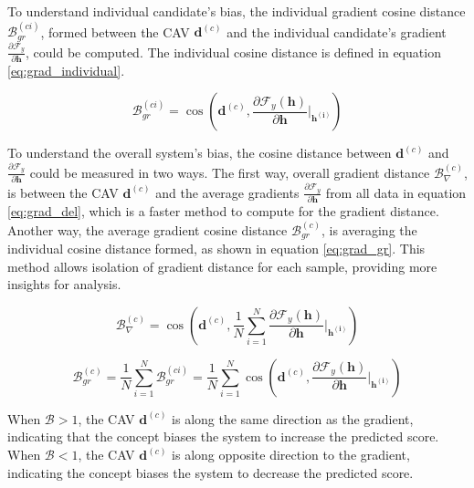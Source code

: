 To understand individual candidate's bias, the individual gradient cosine distance $\mathcal{B}^{(ci)}_{gr}$, formed between the CAV $\boldsymbol{d}^{(c)}$ and the individual candidate's gradient $\frac{\partial \mathcal{F}_y}{\partial \boldsymbol{h}}$, could be computed. The individual cosine distance is defined in equation \ref{eq:grad_individual}.  

\begin{equation} \label{eq:grad_individual}
    \mathcal{B}^{(ci)}_{gr} = \cos\left(\boldsymbol{d}^{(c)}, \frac{\partial \mathcal{F}_y(\boldsymbol{h})}{\partial \boldsymbol{h}}\vert_{\boldsymbol{h^{(i)}}} \right)
\end{equation}

To understand the overall system's bias, the cosine distance between $\boldsymbol{d}^{(c)}$ and $\frac{\partial \mathcal{F}_y}{\partial \boldsymbol{h}}$ could be measured in two ways. The first way, overall gradient distance $\mathcal{B}^{(c)}_{\nabla}$,  is between the CAV $\boldsymbol{d}^{(c)}$ and the average gradients $\frac{\partial \mathcal{F}_y}{\partial \boldsymbol{h}}$ from all data in equation \ref{eq:grad_del}, which is a faster method to compute for the gradient distance. Another way, the average gradient cosine distance $\mathcal{B}^{(c)}_{gr}$, is averaging the individual cosine distance formed, as shown in equation \ref{eq:grad_gr}. This method allows isolation of gradient distance for each sample, providing more insights for analysis.

\begin{equation} \label{eq:grad_del}
    \mathcal{B}^{(c)}_{\nabla} = \cos\left(\boldsymbol{d}^{(c)}, \frac{1}{N} \sum_{i=1}^{N} \frac{\partial \mathcal{F}_y(\boldsymbol{h})}{\partial \boldsymbol{h}}\vert_{\boldsymbol{h^{(i)}}} \right)
\end{equation}

\begin{equation} \label{eq:grad_gr}
    \mathcal{B}^{(c)}_{gr} = \frac{1}{N} \sum_{i=1}^{N} \mathcal{B}^{(ci)}_{gr} = \frac{1}{N} \sum_{i=1}^{N}\cos\left(\boldsymbol{d}^{(c)}, \frac{\partial \mathcal{F}_y(\boldsymbol{h})}{\partial \boldsymbol{h}}\vert_{\boldsymbol{h^{(i)}}} \right)
\end{equation}

When $\mathcal{B} > 1$, the CAV $\boldsymbol{d}^{(c)}$ is along the same direction as the gradient, indicating that the concept biases the system to increase the predicted score. When $\mathcal{B} < 1$, the CAV $\boldsymbol{d}^{(c)}$ is along opposite direction to the gradient, indicating the concept biases the system to decrease the predicted score.

